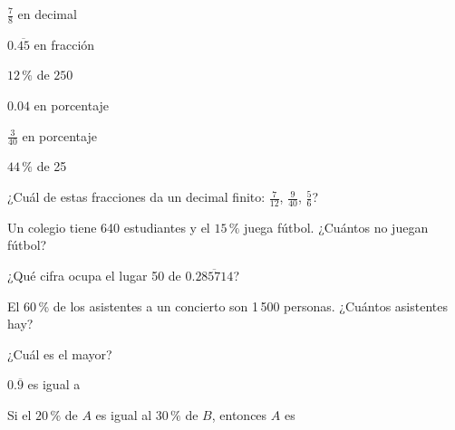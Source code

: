 \taller
{}
\begin{ejercicios}[2]
\item $\tfrac{7}{8}$ en decimal 
\item $0.\overline{45}$ en fracción 
\item $12\,\%$ de $250$ 
\item $0.04$ en porcentaje 
\item $\tfrac{3}{40}$ en porcentaje 
\item $44\,\%$ de 25 
\end{ejercicios}
\begin{ejercicios}
\item ¿Cuál de estas fracciones da un decimal finito: $\tfrac{7}{12}$, $\tfrac{9}{40}$, $\tfrac{5}{6}$? 
\item Un colegio tiene 640 estudiantes y el $15\,\%$ juega fútbol. ¿Cuántos no juegan fútbol? 
\item ¿Qué cifra ocupa el lugar 50 de $0.\overline{285714}$? 
\item El 60\,\% de los asistentes a un concierto son 1\,500 personas. ¿Cuántos asistentes hay? 
\end{ejercicios}
\begin{ejercicios}
\item ¿Cuál es el mayor?
\item $0.\overline{9}$ es igual a
\item Si el $20\,\%$ de $A$ es igual al $30\,\%$ de $B$, entonces $A$ es
\end{ejercicios}

\bitacora


